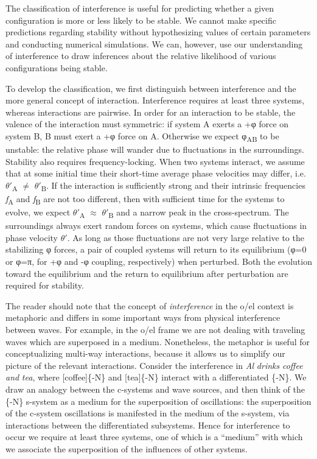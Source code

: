 The classification of interference is useful for predicting whether a given configuration is more or less likely to be stable. We cannot make specific predictions regarding stability without hypothesizing values of certain parameters and conducting numerical simulations. We can, however, use our understanding of interference to draw inferences about the relative likelihood of various configurations being stable.

  To develop the classification, we first distinguish between interference and the more general concept of interaction. Interference requires at least three systems, whereas interactions are pairwise. In order for an interaction to be stable, the valence of the interaction must symmetric: if system A exerts a +φ force on system B, B must exert a +φ force on A. Otherwise we expect φ\textsubscript{AB} to be unstable: the relative phase will wander due to fluctuations in the surroundings. Stability also requires frequency-locking. When two systems interact, we assume that at some initial time their short-time average phase velocities may differ, i.e. $\theta ′$\textsubscript{A} ${\neq}$ $\theta ′$\textsubscript{B}. If the interaction is sufficiently strong and their intrinsic frequencies \textit{f}\textsubscript{A} and \textit{f}\textsubscript{B} are not too different, then with sufficient time for the systems to evolve, we expect $\theta ′$\textsubscript{A} ${\approx}$ $\theta ′$\textsubscript{B} and a narrow peak in the cross-spectrum. The surroundings always exert random forces on systems, which cause fluctuations in phase velocity $\theta ′$. As long as those fluctuations are not very large relative to the stabilizing φ forces, a pair of coupled systems will return to its equilibrium (φ=0 or φ=π, for +φ and -φ coupling, respectively) when perturbed. Both the evolution toward the equilibrium and the return to equilibrium after perturbation are required for stability.

  The reader should note that the concept of \textit{interference} in the o/el context is metaphoric and differs in some important ways from physical interference between waves. For example, in the o/el frame we are not dealing with traveling waves which are superposed in a medium. Nonetheless, the metaphor is useful for conceptualizing multi-way interactions, because it allows us to simplify our picture of the relevant interactions. Consider the interference in \textit{Al} \textit{drinks} \textit{coffee} \textit{and} \textit{tea}, where [coffee]\{-N\} and [tea]\{-N\} interact with a differentiated \{-N\}. We draw an analogy between the c-systems and wave sources, and then think of the \{-N\} s-system as a medium for the superposition of oscillations: the superposition of the c-system oscillations is manifested in the medium of the s-system, via interactions between the differentiated subsystems. Hence for interference to occur we require at least three systems, one of which is a “medium” with which we associate the superposition of the influences of other systems. 

